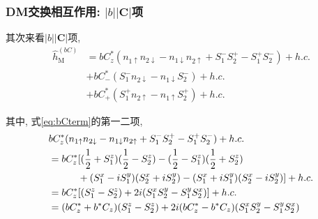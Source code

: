 \documentclass[a4paper, 12pt]{article}
\begin{document}
\subsubsection{DM交换相互作用: \(|b||\mathbf{C}|\)项}
其次来看\(|b||\bm{C}|\)项, 
\begin{equation}\label{eq:bCterm}
  \begin{aligned}
    \widehat{h}_{\text{M}}^{(bC)} 
    &= bC_z^*(n_{1\uparrow}n_{2\downarrow}-n_{1\downarrow}n_{2\uparrow}+S_1^-S_2^+-S_1^+S_2^-) + h.c.\\
    &+bC_-^*(S_1^-n_{2\downarrow} - n_{1\downarrow}S_2^-) + h.c.\\
    &+bC_+^*(S_1^+n_{2\uparrow} - n_{1\uparrow}S_2^+) + h.c.
  \end{aligned}
\end{equation}

其中, 式\eqref{eq:bCterm}的第一二项,
\begin{equation}
  \begin{aligned}
    &bC_z^*(n_{1\uparrow}n_{2\downarrow}-n_{1\downarrow}n_{2\uparrow}+S_1^-S_2^+-S_1^+S_2^-) + h.c.\\
    &= bC_z^*[(\frac{1}{2}+S_1^z)(\frac{1}{2}-S_2^z)-(\frac{1}{2}-S_1^z)(\frac{1}{2}+S_2^z)\\
    &\hspace*{3em}+(S_1^x-iS_1^y)(S_2^x+iS_2^y)-(S_1^x+iS_1^y)(S_2^x-iS_2^y)] + h.c.\\
    &= bC_z^*[(S_1^z - S_2^z) + 2i(S_1^xS_2^y - S_1^yS_2^x)] + h.c.\\
    &= (bC_z^*+b^*C_z)(S_1^z - S_2^z) +2i(bC_z^*-b^*C_z)(S_1^xS_2^y - S_1^yS_2^x)
  \end{aligned}
\end{equation}
\end{document}
